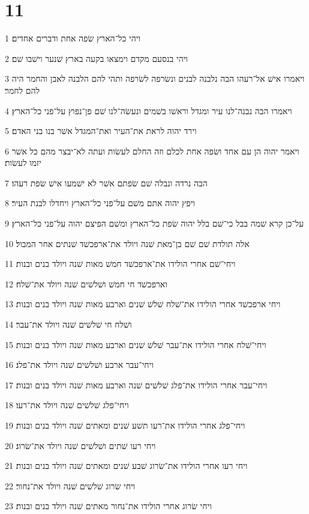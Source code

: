 \chapter{11}

\par 1 ויהי כל־הארץ שׂפה אחת ודברים אחדים׃
\par 2 ויהי בנסעם מקדם וימצאו בקעה בארץ שׁנער וישׁבו שׁם׃
\par 3 ויאמרו אישׁ אל־רעהו הבה נלבנה לבנים ונשׂרפה לשׂרפה ותהי להם הלבנה לאבן והחמר היה להם לחמר׃
\par 4 ויאמרו הבה נבנה־לנו עיר ומגדל וראשׁו בשׁמים ונעשׂה־לנו שׁם פן־נפוץ על־פני כל־הארץ׃
\par 5 וירד יהוה לראת את־העיר ואת־המגדל אשׁר בנו בני האדם׃
\par 6 ויאמר יהוה הן עם אחד ושׂפה אחת לכלם וזה החלם לעשׂות ועתה לא־יבצר מהם כל אשׁר יזמו לעשׂות׃
\par 7 הבה נרדה ונבלה שׁם שׂפתם אשׁר לא ישׁמעו אישׁ שׂפת רעהו׃
\par 8 ויפץ יהוה אתם משׁם על־פני כל־הארץ ויחדלו לבנת העיר׃
\par 9 על־כן קרא שׁמה בבל כי־שׁם בלל יהוה שׂפת כל־הארץ ומשׁם הפיצם יהוה על־פני כל־הארץ׃
\par 10 אלה תולדת שׁם שׁם בן־מאת שׁנה ויולד את־ארפכשׁד שׁנתים אחר המבול׃
\par 11 ויחי־שׁם אחרי הולידו את־ארפכשׁד חמשׁ מאות שׁנה ויולד בנים ובנות׃
\par 12 וארפכשׁד חי חמשׁ ושׁלשׁים שׁנה ויולד את־שׁלח׃
\par 13 ויחי ארפכשׁד אחרי הולידו את־שׁלח שׁלשׁ שׁנים וארבע מאות שׁנה ויולד בנים ובנות׃
\par 14 ושׁלח חי שׁלשׁים שׁנה ויולד את־עבר׃
\par 15 ויחי־שׁלח אחרי הולידו את־עבר שׁלשׁ שׁנים וארבע מאות שׁנה ויולד בנים ובנות׃
\par 16 ויחי־עבר ארבע ושׁלשׁים שׁנה ויולד את־פלג׃
\par 17 ויחי־עבר אחרי הולידו את־פלג שׁלשׁים שׁנה וארבע מאות שׁנה ויולד בנים ובנות׃
\par 18 ויחי־פלג שׁלשׁים שׁנה ויולד את־רעו׃
\par 19 ויחי־פלג אחרי הולידו את־רעו תשׁע שׁנים ומאתים שׁנה ויולד בנים ובנות׃
\par 20 ויחי רעו שׁתים ושׁלשׁים שׁנה ויולד את־שׂרוג׃
\par 21 ויחי רעו אחרי הולידו את־שׂרוג שׁבע שׁנים ומאתים שׁנה ויולד בנים ובנות׃
\par 22 ויחי שׂרוג שׁלשׁים שׁנה ויולד את־נחור׃
\par 23 ויחי שׂרוג אחרי הולידו את־נחור מאתים שׁנה ויולד בנים ובנות׃
